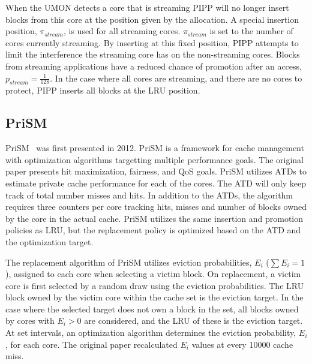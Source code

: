 When the UMON detects a core that is streaming PIPP will no longer insert blocks from this core at the position given by the allocation.
A special insertion position, $\pi_{stream}$, is used for all streaming cores.
$\pi_{stream}$ is set to the number of cores currently streaming. 
By inserting at this fixed position, PIPP attempts to limit the interference the streaming core has on the non-streaming cores.
Blocks from streaming applications have a reduced chance of promotion after an access, $p_{stream} = \frac{1}{128}$.
In the case where all cores are streaming, and there are no cores to protect, PIPP inserts all blocks at the LRU position.

\subsection{PriSM}

PriSM~\cite{Manikantan2012} was first presented in 2012.
PriSM is a framework for cache management with optimization algorithms targetting multiple performance goals.
The original paper presents hit maximization, fairness, and QoS goals.
PriSM utilizes ATDs to estimate private cache performance for each of the cores.
The ATD will only keep track of total number misses and hits.
In addition to the ATDs, the algorithm requires three counters per core tracking hits, misses and number of blocks owned by the core in the actual cache.
PriSM utilizes the same insertion and promotion policies as LRU, but the replacement policy is optimized based on the ATD and the optimization target.

The replacement algorithm of PriSM utilizes eviction probabilities, $E_i$ ($\sum{E_i} = 1$), assigned to each core when selecting a victim block.
On replacement, a victim core is first selected by a random draw using the eviction probabilities.
The LRU block owned by the victim core within the cache set is the eviction target.
In the case where the selected target does not own a block in the set, all blocks owned by cores with $E_i > 0$ are considered, and the LRU of these is the eviction target.
At set intervals, an optimization algorithm determines the eviction probability, $E_i$, for each core.
The original paper recalculated $E_i$ values at every 10000 cache miss.

